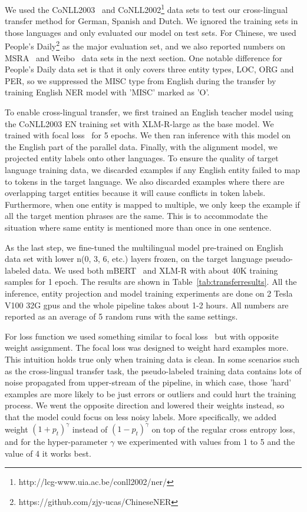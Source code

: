 \documentclass[11pt]{article}
\begin{document}
We used the CoNLL2003~\cite{conll2003ner} and CoNLL2002\footnote{http://lcg-www.uia.ac.be/conll2002/ner/} data sets to test our cross-lingual transfer method for German, Spanish and Dutch. We ignored the training sets in those languages and only evaluated our model on test sets. For Chinese, we used People's Daily\footnote{https://github.com/zjy-ucas/ChineseNER} as the major evaluation set, and we also reported numbers on MSRA~\cite{levow-2006-third} and Weibo~\cite{peng-dredze-2015-named} data sets in the next section. One notable difference for People's Daily data set is that it only covers three entity types, LOC, ORG and PER, so we suppressed the MISC type from English during the transfer by training English NER model with 'MISC' marked as 'O'.

To enable cross-lingual transfer, we first trained an English teacher model using the CoNLL2003 EN training set with XLM-R-large as the base model. We trained with focal loss~\cite{focal} for 5 epochs. We then ran inference with this model on the English part of the parallel data. Finally, with the alignment model, we projected entity labels onto other languages. To ensure the quality of target language training data, we discarded examples if any English entity failed to map to tokens in the target language. We also discarded examples where there are overlapping target entities because it will cause conflicts in token labels. Furthermore, when one entity is mapped to multiple, we only keep the example if all the target mention phrases are the same. This is to accommodate the situation where same entity is mentioned more than once in one sentence.

As the last step, we fine-tuned the multilingual model pre-trained on English data set with lower n(0, 3, 6, etc.) layers frozen, on the target language pseudo-labeled data. We used both mBERT~\cite{devlin-etal-2019-bert, multilingualBERTmd} and XLM-R\cite{Conneau2020} with about 40K training samples for 1 epoch. The results are shown in Table~\ref{tab:transferresults}. All the inference, entity projection and model training experiments are done on 2 Tesla V100 32G gpus and the whole pipeline takes about 1-2 hours. All numbers are reported as an average of 5 random runs with the same settings.

For loss function we used something similar to focal loss~\cite{focal} but with opposite weight assignment. The focal loss was designed to weight hard examples more. This intuition holds true only when training data is clean. In some scenarios such as the cross-lingual transfer task, the pseudo-labeled training data contains lots of noise propagated from upper-stream of the pipeline, in which case, those 'hard' examples are more likely to be just errors or outliers and could hurt the training process. We went the opposite direction and lowered their weights instead, so that the model could focus on less noisy labels. More specifically, we added weight $(1+p_t)^{\gamma}$ instead of $(1-p_t)^{\gamma}$ on top of the regular cross entropy loss, and for the hyper-parameter $\gamma$ we experimented with values from 1 to 5 and the value of 4 it works best.
\end{document}

